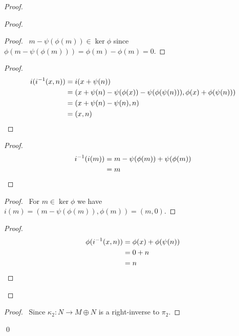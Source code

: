 \begin{proof}
\pf
{}
\begin{proof}
	\begin{proof}
		\pf\ $m - \psi(\phi(m)) \in \ker \phi$ since $\phi(m - \psi(\phi(m))) = \phi(m) - \phi(m) = 0$.
	\end{proof}
	\begin{proof}
		\pf
		\begin{align*}
			i({i}^{-1}(x,n)) & = i(x + \psi(n)) \\
			& = (x + \psi(n) - \psi(\phi(x)) - \psi(\phi(\psi(n))), \phi(x) + \phi(\psi(n))) \\
			& = (x + \psi(n) - \psi(n), n) \\
			& = (x, n)
		\end{align*}
	\end{proof}
	\begin{proof}
		\pf
		\begin{align*}
			{i}^{-1}(i(m)) & = m - \psi(\phi(m)) + \psi(\phi(m)) \\
			& = m
		\end{align*}
	\end{proof}
	\begin{proof}
		\pf\ For $m \in \ker \phi$ we have $i(m) = (m - \psi(\phi(m)), \phi(m)) = (m,0)$.
	\end{proof}
	\begin{proof}
		\pf
		\begin{align*}
			\phi({i}^{-1}(x,n)) & = \phi(x) + \phi(\psi(n)) \\
			& = 0 + n \\
			& = n
		\end{align*}
	\end{proof}
\end{proof}
\begin{proof}
\pf\ Since $\kappa_2 : N \rightarrow M \oplus N$ is a right-inverse to $\pi_2$.
\end{proof}
\qed
\end{proof}

